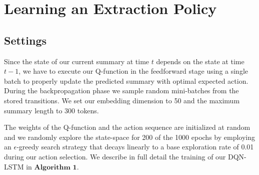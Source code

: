 \documentclass[12pt]{article}
\begin{document}
\section{Learning an Extraction Policy}
\subsection{Settings}
Since the state of our current summary at time $t$ depends on the state at time $t - 1$, we have to execute our Q-function in the feedforward stage using a single batch to properly update the predicted summary with optimal expected action. During the backpropagation phase we sample random mini-batches from the stored transitions.  We set our embedding dimension to 50 and the maximum summary length to 300 tokens.

The weights of the Q-function and the action sequence are initialized at random and we randomly explore the state-space for 200 of the 1000 epochs by employing an $\epsilon$-greedy search strategy that decays linearly to a base exploration rate of 0.01 during our action selection. We describe in full detail the training of our DQN-LSTM in $\textbf{Algorithm 1}$.
\end{document}
